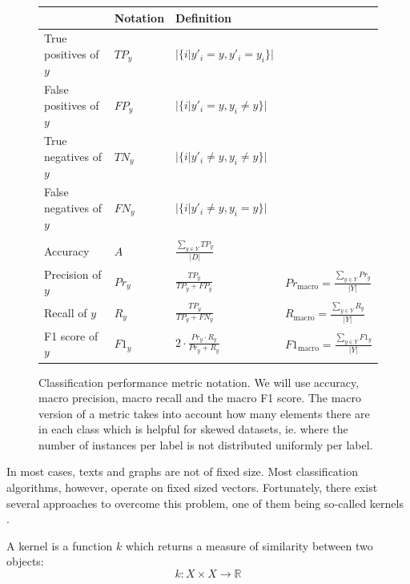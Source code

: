 \begin{figure}[htb!]
	\centering
	\renewcommand*{\arraystretch}{1.7}
	\begin{tabular}{llll}
\toprule
		& Notation & Definition & \\
		\toprule
		True positives of $y$ &
		$TP_y$ &
		$\displaystyle |\{i | y'_i = y, y'_i = y_i \}|$ &
		\\
		False positives of $y$ &
		$FP_y$ &
		$\displaystyle |\{i | y'_i = y, y_i \neq y \}|$ &
		\\
		True negatives of $y$ &
		$TN_y$ &
		$\displaystyle |\{i | y'_i \neq y, y_i \neq y\}|$ &
		\\
		False negatives of $y$ &
		$FN_y$ &
		$\displaystyle |\{i | y'_i \neq y, y_i = y\}|$ &
		\\[1ex]
		\midrule{}%
		\\[-2ex]
		Accuracy &
		$A$ &
		$\displaystyle \frac{\sum\nolimits_{y \in Y} TP_y}{|D|}$ &
		\\[3ex]
		Precision of $y$ &
		$Pr_y$ &
		$\displaystyle \frac{TP_y}{TP_y + FP_y} $ &
		$Pr_{\text{macro}} = \displaystyle \frac{\sum\nolimits_{y \in Y} Pr_y}{|Y|}$
		\\[3ex]
		Recall of $y$ &
		$R_y$ &
		$\displaystyle \frac{TP_y}{TP_y + FN_y}$ &
		$R_{\text{macro}} = \displaystyle \frac{\sum\nolimits_{y \in Y} R_y}{|Y|}$
		\\[3ex]
		F1 score of $y$ &
		$F1_y$ &
		$\displaystyle 2 \cdot \frac{Pr_y \cdot R_y}{Pr_y + R_y}$ &
		$F1_{\text{macro}} = \displaystyle \frac{\sum\nolimits_{y \in Y} F1_y}{|Y|}$
		\\
	\end{tabular}
	\caption[Notation: Classification metrics]{Classification performance metric notation.  We will use accuracy, macro precision, macro recall and the macro F1 score. The macro version of a metric takes into account how many elements there are in each class which is helpful for skewed datasets, ie. where the number of instances per label is not distributed uniformly per label.}\label{fig:classification_metrics}
\end{figure}


In most cases, texts and graphs are not of fixed size.
Most classification algorithms, however, operate on fixed sized vectors.
Fortunately, there exist several approaches to overcome this problem, one of them being so-called kernels \cite{Kriege2012}\cite[p.~295]{Bishop2006}.

A kernel is a function $k$ which returns a measure of similarity between two objects:
\begin{equation*}
k: X \times X \rightarrow \mathbb{R}
\end{equation*}

